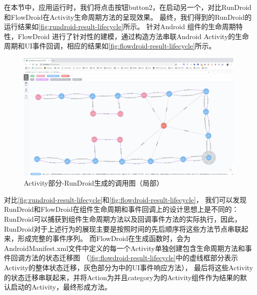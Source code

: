 在本节中，应用运行时，我们将点击按钮button2，在启动另一个，对比RunDroid和FlowDroid在Activity生命周期方法的呈现效果。
最终，我们得到的RunDroid的运行结果如\autoref{fig:rundroid-result-lifecycle}所示。
针对Android 组件的生命周期特性，FlowDroid 进行了针对性的建模，通过构造方法串联Android Activity的生命周期和UI事件回调，相应的结果如\autoref{fig:flowdroid-result-lifecycle}所示。

\begin{figure}[ht]
	\centering
	\includegraphics[width=\textwidth]{./Figures/android-lifecycle-rundroid.png}
	\caption{Activity部分-RunDroid生成的调用图（局部）}
	\label{fig:rundroid-result-lifecycle}
\end{figure}

对比\autoref{fig:rundroid-result-lifecycle}和\autoref{fig:flowdroid-result-lifecycle}，
我们可以发现RunDroid和FlowDroid在组件生命周期和事件回调上的设计思想上是不同的：
RunDroid可以捕获到组件生命周期方法以及回调事件方法的实际执行，因此，RunDroid对于上述行为的展现主要是按照时间的先后顺序将这些方法节点串联起来，形成完整的事件序列。
而FlowDroid在生成函数时，会为AndroidManifest.xml文件中定义的每一个Activity单独创建包含生命周期方法和事件回调方法的状态迁移图
（\autoref{fig:flowdroid-result-lifecycle}中的虚线框部分表示Activity的整体状态迁移，灰色部分为中的UI事件响应方法），
最后将这些Activity的状态迁移串联起来，并将Action为并且category为的Activity组件作为结果的默认启动的Activity，最终形成方法。


